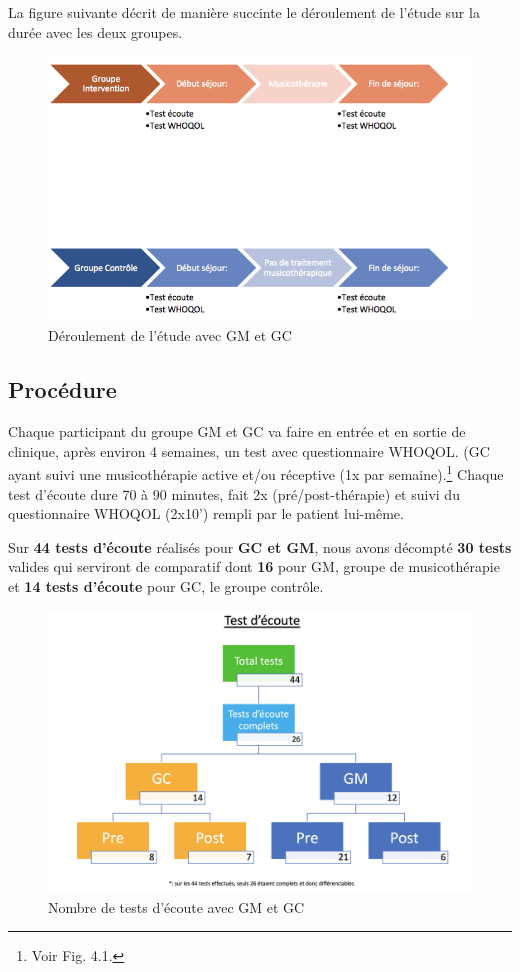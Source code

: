 La figure suivante décrit de manière succinte le déroulement de
l'étude sur la durée avec les deux groupes.



        \begin{figure}[hb]
\centering
\includegraphics[width=0.7\linewidth]{images/Groupecontrole.png}
\caption[Schéma du déroulement]{Déroulement de l'étude avec GM et GC}

\end{figure}

 \subsection{Procédure}
Chaque participant du groupe GM et GC va faire en entrée et en sortie de
clinique, après environ 4 semaines, un
          test avec questionnaire  WHOQOL. (GC ayant suivi une musicothérapie active et/ou réceptive (1x par
        semaine).\footnote{Voir Fig. 4.1.}
          Chaque test d'écoute dure
        70 à 90 minutes, fait 2x (pré/post-thérapie) et
        suivi du questionnaire WHOQOL (2x10') rempli par le
        patient lui-même.

Sur \textbf{44 tests d'écoute} réalisés pour \textbf{GC et GM},
      nous avons décompté\textbf{ 30 tests} valides qui serviront de
     comparatif dont \textbf{16} pour
     GM, groupe de musicothérapie et \textbf{14 tests d'écoute} pour GC, le groupe
     contrôle.

\begin{figure}
\centering
\includegraphics[width=1\linewidth]{images/graphiques/Testecoute.png}
\caption{Nombre de tests d'écoute avec GM et GC}

\end{figure}



